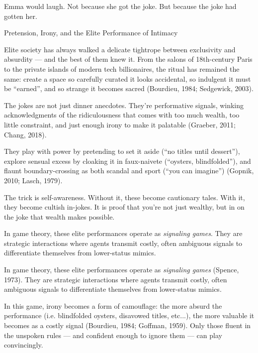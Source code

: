 Emma would laugh.
Not because she got the joke.
But because the joke had gotten her.

\medskip

\begin{HistoricalSidebar}{Pretension, Irony, and the Elite Performance of Intimacy}

  Elite society has always walked a delicate tightrope between exclusivity and absurdity — and the best 
  of them knew it. From the salons of 18th-century Paris to the private islands of modern tech 
  billionaires, the ritual has remained the same: create a space so carefully curated it looks 
  accidental, so indulgent it must be ``earned'', and so strange it becomes sacred (Bourdieu, 1984; 
  Sedgewick, 2003).

  \medskip
  
  The jokes are not just dinner anecdotes. They’re performative signals, winking acknowledgments of the 
  ridiculousness that comes with too much wealth, too little constraint, and just enough irony to 
  make it palatable (Graeber, 2011; Chang, 2018).

  \medskip
  
  They play with power by pretending to set it aside (“no titles until dessert”), explore sensual 
  excess by cloaking it in faux-naivete (“oysters, blindfolded”), and flaunt boundary-crossing as 
  both scandal and sport (“you can imagine”) (Gopnik, 2010; Lasch, 1979). 

  \medskip
  
  The trick is self-awareness. Without it, these become cautionary tales. With it, they become 
  cultish in-jokes. It is proof that you’re not just wealthy, but in on the joke that wealth makes 
  possible.

  \medskip

  In game theory, these elite performances operate as \emph{signaling games}. They are strategic 
  interactions where 
  agents transmit costly, often ambiguous signals to differentiate themselves from lower-status mimics.

  \medskip

  In game theory, these elite performances operate as \emph{signaling games} (Spence, 1973). They are strategic 
  interactions where agents transmit costly, often ambiguous signals to differentiate themselves from lower-status mimics.
  
  \medskip
  
  In this game, irony becomes a form of camouflage: the more absurd the performance (i.e. blindfolded oysters, 
  disavowed titles, etc...), the more valuable it becomes as a costly signal (Bourdieu, 1984; Goffman, 1959). 
  Only those fluent in the unspoken rules --- and confident enough to ignore them --- can play convincingly.
  

\end{HistoricalSidebar}
